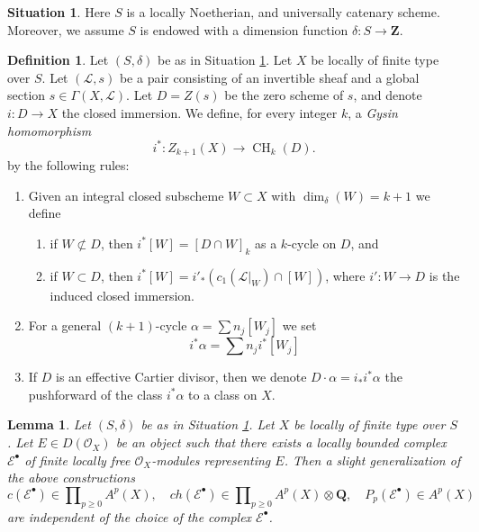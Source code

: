 \documentclass{amsart}
\theoremstyle{plain}
\newtheorem{lemma}[subsection]{Lemma}
\theoremstyle{definition}
\newtheorem{definition}[subsection]{Definition}
\newtheorem{situation}[subsection]{Situation}
\theoremstyle{remark}
\numberwithin{equation}{subsection}
\def\CH{\mathop{\mathrm{CH}}\nolimits}
\begin{document}
\begin{situation}
\label{situation-setup}
Here $S$ is a locally Noetherian, and universally catenary scheme.
Moreover, we assume $S$ is endowed with a dimension function
$\delta : S \longrightarrow \mathbf{Z}$.
\end{situation}

\begin{definition}
\label{definition-gysin-homomorphism}
Let $(S, \delta)$ be as in Situation \ref{situation-setup}.
Let $X$ be locally of finite type over $S$.
Let $(\mathcal{L}, s)$ be a pair consisting of an invertible
sheaf and a global section $s \in \Gamma(X, \mathcal{L})$.
Let $D = Z(s)$ be the zero scheme of $s$, and
denote $i : D \to X$ the closed immersion.
We define, for every integer $k$, a {\it Gysin homomorphism}
$$
i^* : Z_{k + 1}(X) \to \CH_k(D).
$$
by the following rules:
\begin{enumerate}
\item Given an integral closed subscheme $W \subset X$ with
$\dim_\delta(W) = k + 1$ we define
\begin{enumerate}
\item if $W \not \subset D$, then $i^*[W] = [D \cap W]_k$ as a
$k$-cycle on $D$, and
\item if $W \subset D$, then
$i^*[W] = i'_*(c_1(\mathcal{L}|_W) \cap [W])$,
where $i' : W \to D$ is the induced closed immersion.
\end{enumerate}
\item For a general $(k + 1)$-cycle $\alpha = \sum n_j[W_j]$
we set
$$
i^*\alpha = \sum n_j i^*[W_j]
$$
\item If $D$ is an effective Cartier divisor, then we denote
$D \cdot \alpha = i_*i^*\alpha$ the pushforward of the class $i^*\alpha$
to a class on $X$.
\end{enumerate}
\end{definition}

\begin{lemma}
\label{lemma-pre-derived-chern-class}
Let $(S, \delta)$ be as in Situation \ref{situation-setup}.
Let $X$ be locally of finite type over $S$. Let $E \in D(\mathcal{O}_X)$
be an object such that there exists a locally bounded complex
$\mathcal{E}^\bullet$ of finite locally free $\mathcal{O}_X$-modules
representing $E$. Then a slight generalization of the above constructions
$$
c(\mathcal{E}^\bullet) \in \prod\nolimits_{p \geq 0} A^p(X),\quad
ch(\mathcal{E}^\bullet) \in
\prod\nolimits_{p \geq 0} A^p(X) \otimes \mathbf{Q},\quad
P_p(\mathcal{E}^\bullet) \in A^p(X)
$$
are independent of the choice of the complex $\mathcal{E}^\bullet$.
\end{lemma}
\end{document}
